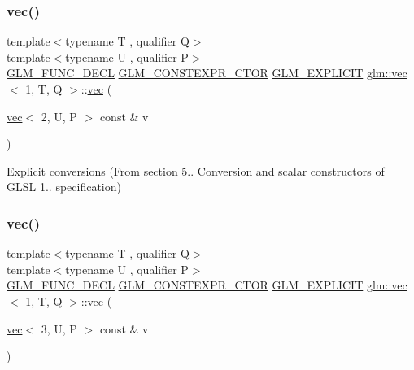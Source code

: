 \subsubsection{\texorpdfstring{vec()}{vec()}\hspace{0.1cm}{\footnotesize\ttfamily [5/14]}}
{\footnotesize\ttfamily template$<$typename T , qualifier Q$>$ \\
template$<$typename U , qualifier P$>$ \\
\mbox{\hyperlink{setup_8hpp_ab2d052de21a70539923e9bcbf6e83a51}{G\+L\+M\+\_\+\+F\+U\+N\+C\+\_\+\+D\+E\+CL}} \mbox{\hyperlink{setup_8hpp_ad34178a09666081abdb573c14d1f4a5a}{G\+L\+M\+\_\+\+C\+O\+N\+S\+T\+E\+X\+P\+R\+\_\+\+C\+T\+OR}} \mbox{\hyperlink{setup_8hpp_a6c74f5a5e7b134ab69023ff9a30d4d5d}{G\+L\+M\+\_\+\+E\+X\+P\+L\+I\+C\+IT}} \mbox{\hyperlink{structglm_1_1vec}{glm\+::vec}}$<$ 1, T, Q $>$\+::\mbox{\hyperlink{structglm_1_1vec}{vec}} (\begin{DoxyParamCaption}\item[{\mbox{\hyperlink{structglm_1_1vec}{vec}}$<$ 2, U, P $>$ const \&}]{v }\end{DoxyParamCaption})}



Explicit conversions (From section 5.. Conversion and scalar constructors of G\+L\+SL 1.. specification) 

\mbox{\label{structglm_1_1vec_3_011_00_01_t_00_01_q_01_4_ab2af72d32392be4ad056d846d6552a85}} 
\subsubsection{\texorpdfstring{vec()}{vec()}\hspace{0.1cm}{\footnotesize\ttfamily [6/14]}}
{\footnotesize\ttfamily template$<$typename T , qualifier Q$>$ \\
template$<$typename U , qualifier P$>$ \\
\mbox{\hyperlink{setup_8hpp_ab2d052de21a70539923e9bcbf6e83a51}{G\+L\+M\+\_\+\+F\+U\+N\+C\+\_\+\+D\+E\+CL}} \mbox{\hyperlink{setup_8hpp_ad34178a09666081abdb573c14d1f4a5a}{G\+L\+M\+\_\+\+C\+O\+N\+S\+T\+E\+X\+P\+R\+\_\+\+C\+T\+OR}} \mbox{\hyperlink{setup_8hpp_a6c74f5a5e7b134ab69023ff9a30d4d5d}{G\+L\+M\+\_\+\+E\+X\+P\+L\+I\+C\+IT}} \mbox{\hyperlink{structglm_1_1vec}{glm\+::vec}}$<$ 1, T, Q $>$\+::\mbox{\hyperlink{structglm_1_1vec}{vec}} (\begin{DoxyParamCaption}\item[{\mbox{\hyperlink{structglm_1_1vec}{vec}}$<$ 3, U, P $>$ const \&}]{v }\end{DoxyParamCaption})}



